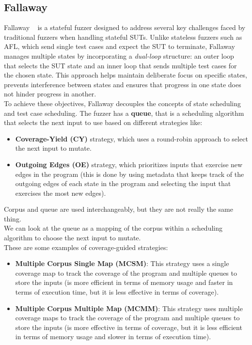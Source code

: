 \subsection{Fallaway}
Fallaway ~\cite{Fallaway} is a stateful fuzzer designed to address several key challenges faced by traditional fuzzers when handling stateful SUTs. Unlike stateless fuzzers such as AFL, which send single test cases and expect the SUT to terminate, Fallaway manages multiple states by incorporating a \textit{dual-loop} structure: an outer loop that selects the SUT state and an inner loop that sends multiple test cases for the chosen state. This approach helps maintain deliberate focus on specific states, prevents interference between states and ensures that progress in one state does not hinder progress in another.
\\To achieve these objectives, Fallaway decouples the concepts of state scheduling and test case scheduling.
The fuzzer has a \textbf{queue}, that is a scheduling algorithm that selects the next input to use based on different strategies like:
\begin{itemize}
    \item \textbf{Coverage-Yield (CY)} strategy, which uses a round-robin approach to select the next input to mutate.
    \item \textbf{Outgoing Edges (OE)} strategy, which prioritizes inputs that exercise new edges in the program (this is done by using metadata that keeps track of the outgoing edges of each state in the program and selecting the input that exercises the most new edges).
\end{itemize} 
Corpus and queue are used interchangeably, but they are not really the same thing. \\We can look at the queue as a mapping of the corpus within a scheduling algorithm to choose the next input to mutate.
\\These are some examples of coverage-guided strategies:
\begin{itemize}
    \item \textbf{Multiple Corpus Single Map (MCSM)}: This strategy uses a single coverage map to track the coverage of the program and multiple queues to store the inputs (is more efficient in terms of memory usage and faster in terms of execution time, but it is less effective in terms of coverage).
    
    \item \textbf{Multiple Corpus Multiple Map (MCMM)}: This strategy uses multiple coverage maps to track the coverage of the program and multiple queues to store the inputs (is more effective in terms of coverage, but it is less efficient in terms of memory usage and slower in terms of execution time).
\end{itemize}
